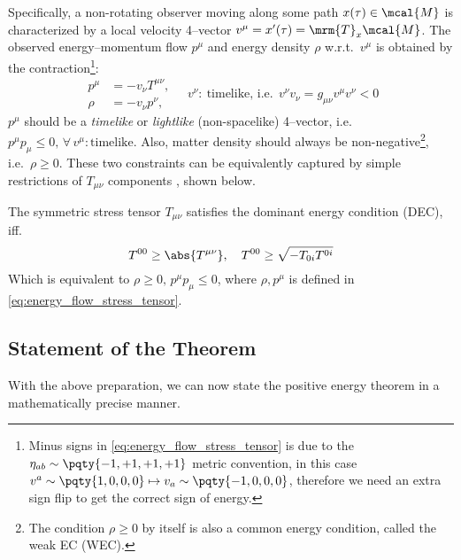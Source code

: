 \documentclass[a4paper,11pt]{article}
\begin{document}
	Specifically, a non-rotating observer moving along some path $x(\tau)\in\mcal{M}$ is characterized by a local velocity 4--vector $v^\mu = x'(\tau) = \mrm{T}_x \mcal{M}$. The observed energy--momentum flow $p^\mu$ and energy density $\rho$ w.r.t.~$v^\mu$ is obtained by the contraction\footnote{
		Minus signs in \eqref{eq:energy_flow_stress_tensor} is due to the $\eta_{ab}\sim\pqty{-1,+1,+1,+1}$ metric convention, in this case $v^a\sim\pqty{1,0,0,0}\mapsto v_a\sim\pqty{-1,0,0,0}$, therefore we need an extra sign flip to get the correct sign of energy. 
	}:
	\begin{equation}
		\begin{aligned}
			p^\mu &= - v_\nu T^{\mu\nu},\\[-.2ex]
			\rho &= - v_\nu p^\nu,
		\end{aligned}\quad%
		v^\nu\colon\ \text{timelike, i.e.}\ \ %
		v^\nu v_\nu
		= g_{\mu\nu} v^\mu v^\nu
		< 0
		\label{eq:energy_flow_stress_tensor}
	\end{equation}
	$p^\mu$ should be a \textit{timelike} or \textit{lightlike} (non-spacelike) 4--vector, i.e.~$p^\mu p_\mu \le 0,\,\forall\,v^\mu\colon\text{timelike}$. Also, matter density should always be non-negative\footnote{
		The condition $\rho\ge 0$ by itself is also a common energy condition, called the weak EC (WEC). 
	}, i.e.~$\rho \ge 0$. These two constraints can be equivalently captured by simple restrictions of $T_{\mu\nu}$ components \cite{Straumann:2013spu}, shown below. 
\pagebreak[3]
	
	\begin{definition*}
		The symmetric stress tensor $T_{\mu\nu}$ satisfies the dominant energy condition (DEC), iff.
		\begin{equation}
			T^{00} \ge \abs{T^{\mu\nu}},\quad
			T^{00} \ge \sqrt{-T_{0i} T^{0i}}
			\label{eq:DEC}
		\end{equation}
		Which is equivalent to $\rho \ge 0,\,p^\mu p_\mu \le 0$, where $\rho,p^\mu$ is defined in \eqref{eq:energy_flow_stress_tensor}. 
	\end{definition*}
\subsection{Statement of the Theorem}
	With the above preparation, we can now state the positive energy theorem in a mathematically precise manner.
	
\end{document}
